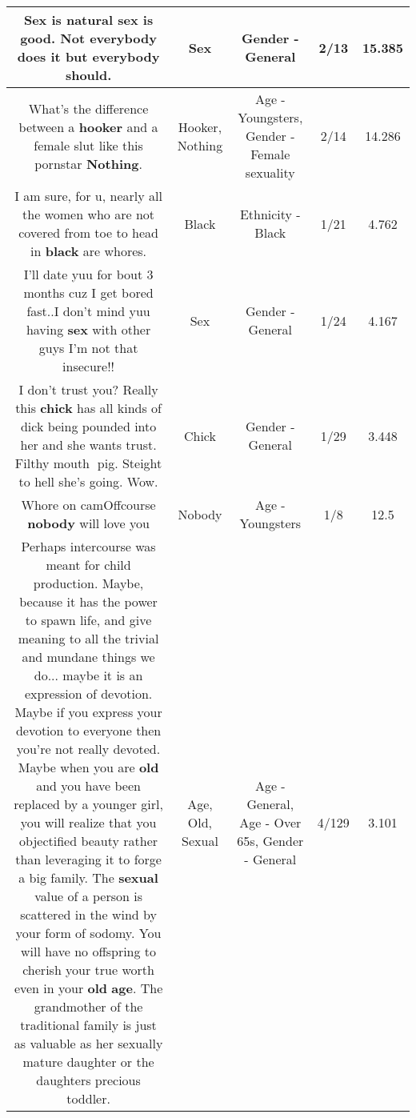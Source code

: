 \documentclass[11pt]{article}
\newlength\mylength
\begin{document}
\begin{center}
\begin{longtable}{|C{.65\mylength}|C{.30\mylength}|C{.12\mylength}|C{.12\mylength}|C{.12\mylength}|}
  \small Sex is natural \textbf{sex} is good. Not everybody does it but everybody should.\normalsize   & Sex & Gender - General & 2/13 & 15.385 \\  \hline
  \small What's the difference between a \textbf{hooker} and a female slut like this pornstar \textbf{Nothing}.\normalsize   & Hooker, Nothing & Age - Youngsters, Gender - Female sexuality & 2/14 & 14.286 \\  \hline
  \small I am sure, for u, nearly all the women who are not covered from toe to head in \textbf{black} are whores.\normalsize   & Black & Ethnicity - Black & 1/21 & 4.762 \\  \hline
  \small I'll date yuu for bout 3 months cuz I get bored fast..I don't mind yuu having \textbf{sex} with other guys I'm not that insecure!!\normalsize   & Sex & Gender - General & 1/24 & 4.167 \\  \hline
  \small I don't trust you?  Really this \textbf{chick} has all kinds of dick being pounded into her and she wants trust.  Filthy mouth 🐖pig.  Steight to hell she's going.  Wow.\normalsize   & Chick & Gender - General & 1/29 & 3.448 \\  \hline
  \small Whore on camOffcourse \textbf{nobody} will love you\normalsize   & Nobody & Age - Youngsters & 1/8 & 12.5 \\  \hline
  \small Perhaps intercourse was meant for child production. Maybe, because it has the power to spawn life, and give meaning to all the trivial and mundane things we do... maybe it is an expression of devotion. Maybe if you express your devotion to everyone then you're not really devoted. Maybe when you are \textbf{old} and you have been replaced by a younger girl, you will realize that you objectified beauty rather than leveraging it to forge a big family. The \textbf{sexual} value of a person is scattered in the wind by your form of sodomy. You will have no offspring to cherish your true worth even in your \textbf{old} \textbf{age}. The grandmother of the traditional family is just as valuable as her sexually mature daughter or the daughters precious toddler.\normalsize   & Age, Old, Sexual & Age - General, Age - Over 65s, Gender - General & 4/129 & 3.101 \\  \hline

\end{longtable}
\end{center}
\end{document}
